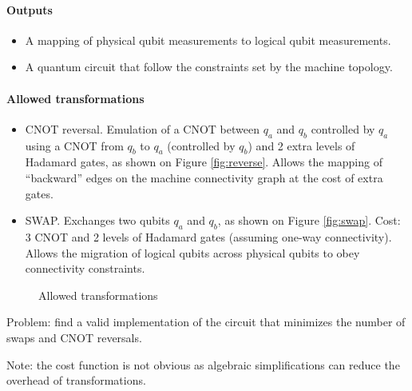 \documentclass[11pt,a4paper]{article}
\begin{document}
\paragraph{Outputs}
\begin{itemize}
\item A mapping of physical qubit measurements to logical qubit measurements.
\item A quantum circuit that follow the constraints set by the machine topology.
\end{itemize}

\paragraph{Allowed transformations}
\begin{itemize}
\item CNOT reversal. Emulation of a CNOT between $q_a$ and $q_b$ controlled by $q_a$ using a CNOT from $q_b$ to $q_a$ (controlled by $q_b$) and 2 extra levels of Hadamard gates, as shown on Figure \ref{fig:reverse}. Allows the mapping of ``backward'' edges on the machine connectivity graph at the cost of extra gates.
\item SWAP. Exchanges two qubits $q_a$ and $q_b$, as shown on Figure \ref{fig:swap}. Cost: 3 CNOT and 2 levels of Hadamard gates (assuming one-way connectivity). Allows the migration of logical qubits across physical qubits to obey connectivity constraints.
\end{itemize}

\begin{figure}[htb]
\caption{Allowed transformations}
\label{fig:transformations}
\end{figure}


Problem: find a valid implementation of the circuit that minimizes the number of swaps and CNOT reversals.

Note: the cost function is not obvious as algebraic simplifications can reduce the overhead of transformations.
\end{document}
